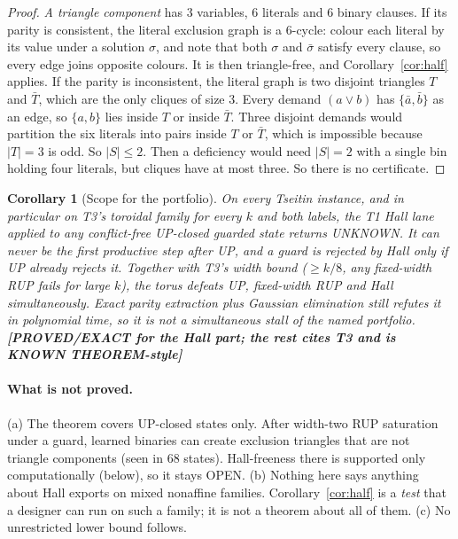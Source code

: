 \documentclass[11pt]{article}
\newtheorem{corollary}{Corollary}
\theoremstyle{definition}
\theoremstyle{remark}
\newcommand{\lab}[1]{\textbf{[#1]}}
\begin{document}
\begin{proof}
\emph{A triangle component} has 3 variables, 6 literals and 6 binary clauses. If its parity is
consistent, the literal exclusion graph is a 6-cycle: colour each literal by its value under a
solution $\sigma$, and note that both $\sigma$ and $\bar\sigma$ satisfy every clause, so every
edge joins opposite colours. It is then triangle-free, and Corollary~\ref{cor:half} applies. If
the parity is inconsistent, the literal graph is two disjoint triangles $T$ and $\bar T$, which
are the only cliques of size 3. Every demand $(a\vee b)$ has $\{\bar a,\bar b\}$ as an edge, so
$\{a,b\}$ lies inside $T$ or inside $\bar T$. Three disjoint demands would partition the six
literals into pairs inside $T$ or $\bar T$, which is impossible because $|T|=3$ is odd. So
$|S|\le2$. Then a deficiency would need $|S|=2$ with a single bin holding four literals, but
cliques have at most three. So there is no certificate.
\end{proof}

\begin{corollary}[Scope for the portfolio]\label{cor:portfolio}
On every Tseitin instance, and in particular on T3's toroidal family for every $k$ and both
labels, the T1 Hall lane applied to any conflict-free UP-closed guarded state returns UNKNOWN.
It can never be the first productive step after UP, and a guard is rejected by Hall only if UP
already rejects it. Together with T3's width bound ($\ge k/8$, any fixed-width RUP fails for
large $k$), the torus defeats UP, fixed-width RUP and Hall simultaneously. Exact parity
extraction plus Gaussian elimination still refutes it in polynomial time, so it is \emph{not}
a simultaneous stall of the named portfolio. \lab{PROVED/EXACT for the Hall part; the rest
cites T3 and is KNOWN THEOREM-style}
\end{corollary}

\paragraph{What is not proved.} (a) The theorem covers UP-closed states only. After width-two
RUP saturation under a guard, learned binaries can create exclusion triangles that are not
triangle components (seen in 68 states). Hall-freeness there is supported only
computationally (below), so it stays OPEN. (b) Nothing here says anything about Hall exports on
mixed nonaffine families. Corollary~\ref{cor:half} is a \emph{test} that a designer can run on
such a family; it is not a theorem about all of them. (c) No unrestricted lower bound follows.
\end{document}
